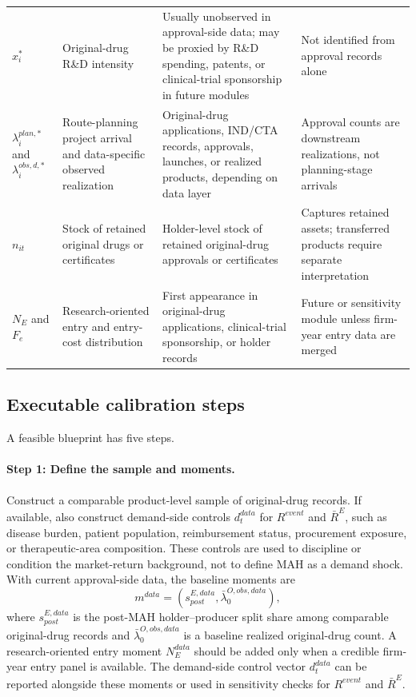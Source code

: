 \documentclass[12pt]{article}
\newcommand{\1}{\mathbf{1}}
\begin{document}
\begin{table}[htbp]
\begin{tabularx}{\textwidth}{@{}L{0.17\textwidth}L{0.25\textwidth}L{0.24\textwidth}Y@{}}
$x_i^*$ & Original-drug R\&D intensity & Usually unobserved in approval-side data; may be proxied by R\&D spending, patents, or clinical-trial sponsorship in future modules & Not identified from approval records alone \\
$\lambda_i^{plan,*}$ and $\lambda_i^{obs,d,*}$ & Route-planning project arrival and data-specific observed realization & Original-drug applications, IND/CTA records, approvals, launches, or realized products, depending on data layer & Approval counts are downstream realizations, not planning-stage arrivals \\
$n_{it}$ & Stock of retained original drugs or certificates & Holder-level stock of retained original-drug approvals or certificates & Captures retained assets; transferred products require separate interpretation \\
$N_E$ and $F_e$ & Research-oriented entry and entry-cost distribution & First appearance in original-drug applications, clinical-trial sponsorship, or holder records & Future or sensitivity module unless firm-year entry data are merged \\
\bottomrule
\end{tabularx}
\end{table}

\subsection{Executable calibration steps}

A feasible blueprint has five steps.

\paragraph{Step 1: Define the sample and moments.}
Construct a comparable product-level sample of original-drug records. If available, also construct demand-side controls $d_t^{data}$ for $R^{event}$ and $\bar R^E$, such as disease burden, patient population, reimbursement status, procurement exposure, or therapeutic-area composition. These controls are used to discipline or condition the market-return background, not to define MAH as a demand shock. With current approval-side data, the baseline moments are
\[
m^{data}
=
\left(
s^{E,data}_{post},
\bar\lambda^{O,obs,data}_{0}
\right),
\]
where $s^{E,data}_{post}$ is the post-MAH holder--producer split share among comparable original-drug records and $\bar\lambda^{O,obs,data}_{0}$ is a baseline realized original-drug count. A research-oriented entry moment $N_E^{data}$ should be added only when a credible firm-year entry panel is available. The demand-side control vector $d_t^{data}$ can be reported alongside these moments or used in sensitivity checks for $R^{event}$ and $\bar R^E$.
\end{document}
